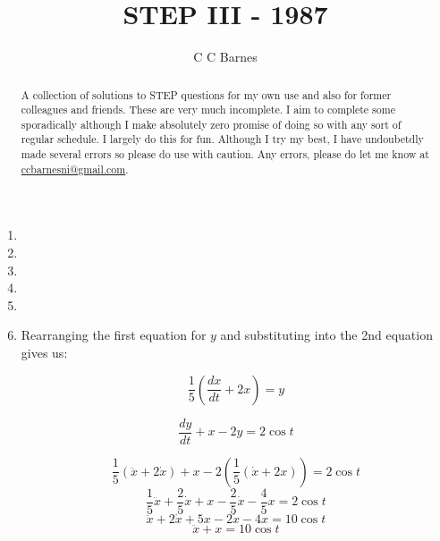 \documentclass{article}
\title{STEP III - 1987}
\author{C C Barnes}
\begin{document}
\maketitle

\begin{abstract}
    A collection of solutions to STEP questions for my own use and also for former colleagues and friends. These are very much incomplete. I aim to complete some sporadically although I make absolutely zero promise of doing so with any sort of regular schedule. I largely do this for fun. Although I try my best, I have undoubetdly made several errors so please do use with caution. Any errors, please do let me know at \url{ccbarnesni@gmail.com}.
\end{abstract}

\newpage

\begin{enumerate}
    \item 

    \item 

    \item 
    
    \item
    
    \item
    
    \item Rearranging the first equation for \(y\) and substituting into the 2nd equation gives us:

\begin{equation*}
\frac{1}{5} \left( \frac{dx}{dt} + 2x \right) = y
\end{equation*}

\begin{equation*}
\frac{dy}{dt} + x - 2y = 2 \cos t
\end{equation*}

\begin{equation*}
\frac{1}{5} (\ddot{x} + 2\dot{x}) + x - 2\left(\frac{1}{5}(\dot{x} + 2x)\right) = 2 \cos t
\end{equation*}
\begin{equation*}
\frac{1}{5} \ddot{x} + \frac{2}{5} \dot{x} + x - \frac{2}{5} \dot{x} - \frac{4}{5} x = 2 \cos t
\end{equation*}
\begin{equation*}
\ddot{x} + 2\dot{x} + 5x - 2\dot{x} - 4x = 10 \cos t
\end{equation*}
\begin{equation*}
\ddot{x} + x = 10 \cos t
\end{equation*}


\end{enumerate}
\end{document}
